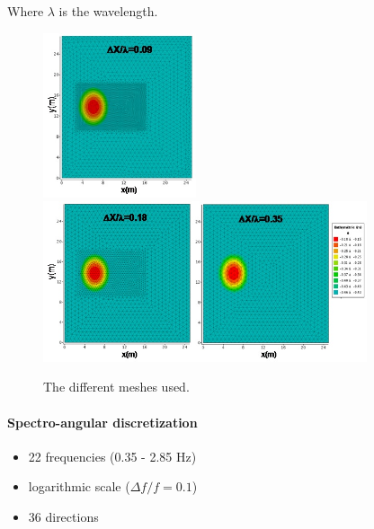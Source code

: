 Where $\lambda$ is the wavelength.
\begin{figure}[h!]
  \centering
    \includegraphics[width=0.4\textwidth]{mesh009.jpg}\\
    \includegraphics[width=0.85\textwidth]{meshes018035.jpg}
      \caption{The different meshes used.}
\label{meshshoal}
\end{figure}

\paragraph{Spectro-angular discretization}
\begin{itemize}
\item 22 frequencies (0.35 - 2.85 Hz)
\item logarithmic scale ($\Delta f/f = 0.1$)
\item 36 directions
\end{itemize}

